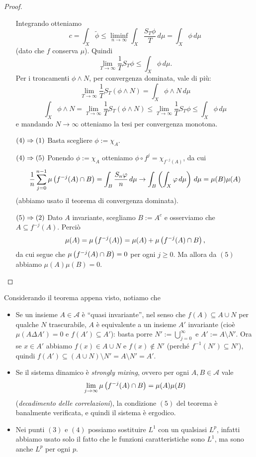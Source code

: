 \begin{proof}
\begin{itemize}
	    Integrando otteniamo 
	    \[c=\int_X\tilde{\phi} \le \liminf_{n\to\infty}\int_X\frac{S_T\phi}{T}\,d\mu=\int_X\phi\,d\mu\]
	    (dato che $f$ conserva $\mu$). Quindi 
	    \[\lim_{T\to\infty}\frac{1}{T}S_T\phi\le \int_X\phi\,d\mu.\] 
	    Per i troncamenti $\phi\wedge N$, per convergenza dominata, vale di più: 
	    \[\lim_{T\to\infty}\frac{1}{T}S_T(\phi\wedge N)=\int_X \phi\wedge N\,d\mu\]
	    \[ \int_X\phi\wedge N=\lim_{T\to\infty}\frac{1}{T}S_T(\phi\wedge N)\le\lim_{T\to\infty}\frac{1}{T}S_T\phi\le \int_X\phi\,d\mu \]
	    e mandando $N\to\infty$ otteniamo la tesi per convergenza monotona.
    \item[$(4)\Rightarrow (1)$] Basta scegliere $\phi:=\chi_A$.
    \item[$(4)\Rightarrow(5)$] Ponendo $\phi:=\chi_A$ otteniamo $\phi\circ f^j=\chi_{f^{-j}(A)}$, da cui
	    \[ \frac{1}{n}\sum_{j=0}^{n-1}\mu\left(f^{-j}(A)\cap B\right)=\int_B\frac{S_n\varphi}{n}\,d\mu\to\int_B\left(\int_X\varphi\,d\mu\right)\,d\mu=\mu(B)\mu(A) \]
	    (abbiamo usato il teorema di convergenza dominata).
    \item[$(5)\Rightarrow (2)$] Dato $A$ invariante, scegliamo $B:=A^c$ e osserviamo che $A\subseteq f^{-j}(A)$. Perciò
	    \[ \mu(A)=\mu\left(f^{-j}(A)\right)=\mu(A)+\mu\left(f^{-j}(A)\cap B\right), \]
	    da cui segue che $\mu\left(f^{-j}(A)\cap B\right)=0$ per ogni $j\ge 0$. Ma allora da $(5)$ abbiamo $\mu(A)\mu(B)=0$.
      \end{itemize}
\end{proof}

\begin{oss}\label{ossergodicita} Considerando il teorema appena visto, notiamo che \begin{itemize}
    \item Se un insieme $A\in\mathcal{A}$ è ``quasi invariante'', nel senso che $f(A)\subseteq A\cup N$ per qualche
      $N$ trascurabile, $A$ è equivalente a un insieme $A'$ invariante (cioè $\mu(A\Delta A')=0$ e $f(A')\subseteq A'$):
      basta porre $N':=\bigcup_{j=0}^\infty$ e $A':=A\setminus N'$. Ora se $x\in A'$ abbiamo
      $f(x)\in A\cup N$ e $f(x)\nin N'$ (perché $f^{-1}(N')\subseteq N'$), quindi $f(A')\subseteq (A\cup N)\setminus N'=A\setminus N'=A'$.
    \item Se il sistema dinamico è \emph{strongly mixing}, ovvero per ogni $A,B\in\mathcal{A}$ vale
      \[\lim_{j\to\infty}\mu\left(f^{-j}(A)\cap B\right)=\mu(A)\mu(B)\] 
      (\emph{decadimento delle correlazioni}), la condizione $(5)$ del teorema è banalmente verificata, e quindi il sistema è ergodico.
    \item Nei punti $(3)$ e $(4)$ possiamo sostituire $L^1$ con un qualsiasi $L^p$, infatti abbiamo usato solo il fatto che le funzioni caratteristiche sono $L^1$, 
      ma sono anche $L^p$ per ogni $p$.
\end{itemize}
\end{oss}


